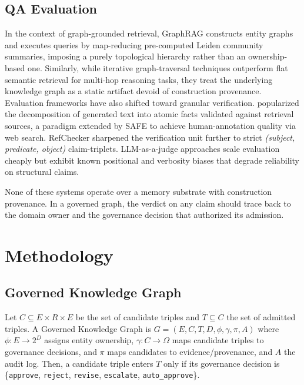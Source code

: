 \documentclass{article}
\begin{document}
\subsection{QA Evaluation}
In the context of graph-grounded retrieval, GraphRAG \citep{edge2024graphrag}
constructs entity graphs and executes queries by map-reducing pre-computed
Leiden community summaries, imposing a purely topological hierarchy rather than
an ownership-based one. Similarly, while iterative graph-traversal techniques
\citep{sun2024tog,luo2024rog} outperform flat semantic retrieval for multi-hop
reasoning tasks, they treat the underlying knowledge graph as a static artifact
devoid of construction provenance. Evaluation frameworks have also shifted
toward granular verification. \citet{min2023factscore} popularized the
decomposition of generated text into atomic facts validated against retrieval
sources, a paradigm extended by SAFE \citep{wei2024safe} to achieve
human-annotation quality via web search. RefChecker \citep{hu2024refchecker}
sharpened the verification unit further to strict \textit{(subject, predicate,
object)} claim-triplets. LLM-as-a-judge approaches \citep{zheng2023judging}
scale evaluation cheaply but exhibit known positional and verbosity biases that
degrade reliability on structural claims.

None of these systems operate over a memory substrate with construction provenance. In a governed graph, the verdict on any claim should trace back to the domain owner and the governance decision that authorized its admission.

\section{Methodology}

\subsection{Governed Knowledge Graph}

Let $C \subseteq E \times R \times E$ be the set of candidate triples and $T \subseteq C$ the set of admitted triples. A Governed Knowledge Graph is $G = (E, C, T, D, \phi, \gamma, \pi, A)$ where $\phi: E \to 2^D$ assigns entity ownership, $\gamma: C \to \Omega$ maps candidate triples to governance decisions, and $\pi$ maps candidates to evidence/provenance, and $A$ the audit log. Then, a candidate triple enters $T$ only if its governance decision is \{\texttt{approve}, \texttt{reject}, \texttt{revise}, \texttt{escalate}, \texttt{auto\_approve}\}.
\end{document}
